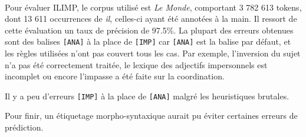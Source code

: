 \documentclass[a4paper,12pt]{article}
\begin{document}
\paragraph*{}
Pour évaluer ILIMP, le corpus utilisé est \emph{Le Monde}, comportant 3 782 613 tokens, dont 13 611 occurrences de \og{}\textit{il}\fg{}, celles-ci ayant été annotées à la main. Il ressort de cette évaluation un taux de précision de 97.5\%. La plupart des erreurs obtenues sont des balises \verb![ANA]! à la place de \verb![IMP]! car \verb![ANA]! est la balise par défaut, et les règles utilisées n'ont pas couvert tous les cas. Par exemple, l'inversion du sujet n'a pas été correctement traitée, le lexique des adjectifs impersonnels est incomplet ou encore l'impasse a été faite sur la coordination.


 Il y a peu d'erreurs \verb![IMP]! à la place de \verb![ANA]! malgré les heuristiques brutales.
 
 Pour finir, un étiquetage morpho-syntaxique aurait pu éviter certaines erreurs de prédiction.

\end{document}
